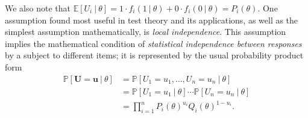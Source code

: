 We also note that $\mathbb{E}[U_i \ | \ \theta]=1 \cdot f_i(1 \ | \ \theta)+ 0 \cdot f_i(0 \ | \ \theta) =P_i(\theta)$.
One assumption found most useful in test theory and its applications, as well as the simplest assumption mathematically, is \emph{local independence}. This assumption implies the mathematical condition of \textit{statistical independence between responses} by a subject to different items; it is represented by the usual probability product form
\begin{equation}
\begin{split}
\mathbb{P}[\boldsymbol{U}=\boldsymbol{u} \ | \ \theta] &= \mathbb{P}[ U_1=u_1, \ldots , U_n=u_n \ | \ \theta] \\
																																																																						&=\mathbb{P}[ U_1=u_1 \ | \ \theta]\cdots \mathbb{P}[ U_n=u_n \ | \ \theta] \\
																																																																						&=\prod_{i=1}^nP_i(\theta)^{u_i}Q_i(\theta)^{1-u_i}.
\end{split}
\end{equation} 

